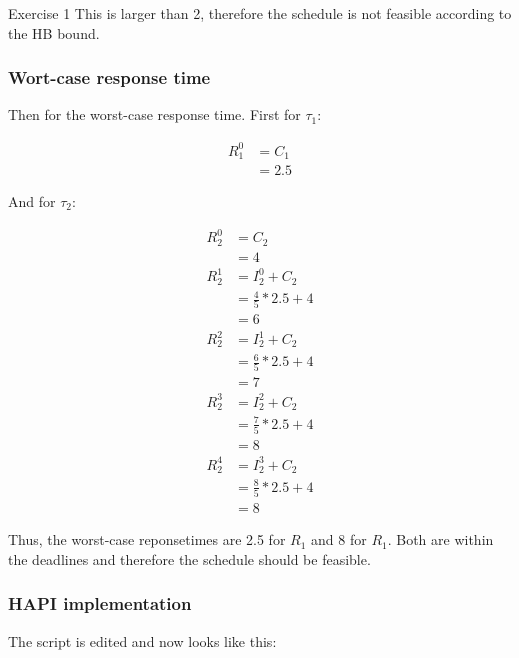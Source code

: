 \begin{homeworkProblem}
\begin{homeworkSection}{Exercise 1}
This is larger than 2, therefore the schedule is not feasible according to the HB bound.

\subsubsection{Wort-case response time}

Then for the worst-case response time. First for $\tau_1$:

\begin{equation} \label{eq:e1_wrc1}
\begin{split}
R_1^0 & = C_1 \\
			& = 2.5 
\end{split}
\end{equation}

And for $\tau_2$:

\begin{equation} \label{eq:e1_wrc2}
\begin{split}
R_2^0 	& = C_2 \\
		& = 4	\\ 
R_2^1 	& = I_2^0 + C_2 \\
		& = \frac{4}{5}*2.5 + 4\\
		& = 6 \\
R_2^2 	& = I_2^1 + C_2 \\
		& = \frac{6}{5}*2.5 + 4 \\
		& = 7 \\
R_2^3	& = I_2^2 + C_2 \\
		& = \frac{7}{5}*2.5 + 4 \\
		& = 8 \\ 
R_2^4	& = I_2^3 + C_2 \\
		& = \frac{8}{5}*2.5 + 4 \\
		& = 8
\end{split}
\end{equation}
\end{homeworkSection}

Thus, the worst-case reponsetimes are 2.5 for $R_1$ and 8 for $R_1$. Both are within the deadlines and therefore the schedule should be feasible.

\subsubsection{HAPI implementation}

The script is edited and now looks like this:



\end{homeworkProblem}
